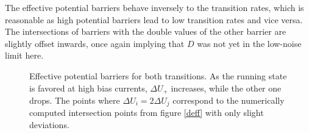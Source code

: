 \documentclass[12pt,a4paper]{article}
\begin{document}
The effective potential barriers behave inversely to the transition rates, which is reasonable as high potential barriers lead to low transition rates and vice versa. The intersections of barriers with the double values of the other barrier are slightly offset inwards, once again implying that $D$ was not yet in the low-noise limit here. 
\begin{figure}[H]
	\hspace*{-0.5cm}
	\caption{Effective potential barriers for both transitions. As the running state is favored at high bias currents, $\Delta U_+$ increases, while the other one drops. The points where $\Delta U_i=2\Delta U_j$ correspond to the numerically computed intersection points from figure \ref{deff} with only slight deviations.}
\end{figure}
\end{document}
